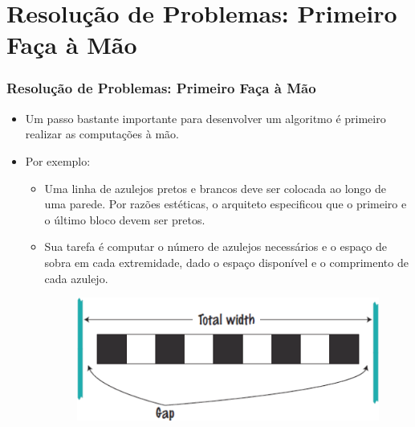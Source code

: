 \documentclass[xcolor={dvipsnames,table},aspectratio=169]{beamer}
\begin{document}
\section{Resolução de Problemas: Primeiro Faça à Mão}

\begin{frame}\frametitle{Resolução de Problemas: Primeiro Faça à Mão}
\begin{itemize}
	\item Um passo bastante importante para desenvolver um algoritmo é primeiro realizar as computações à mão.
	\item Por exemplo:
	\begin{itemize}
		\item Uma linha de azulejos pretos e brancos deve ser colocada ao longo de uma parede. Por razões estéticas, o arquiteto especificou que o primeiro e o último bloco devem ser pretos.
		\item Sua tarefa é computar o número de azulejos necessários e o espaço de sobra em cada extremidade, dado o espaço disponível e o comprimento de cada azulejo.
\begin{figure}[h]
	\includegraphics[height=0.25\paperheight,center]{pucrs-ep-fprog-unidade_02-tipos_de_dados_fundamentais-laminas-exemplo_a_mao.png}
\end{figure}
	\end{itemize}
\end{itemize}
\end{frame}
\end{document}
